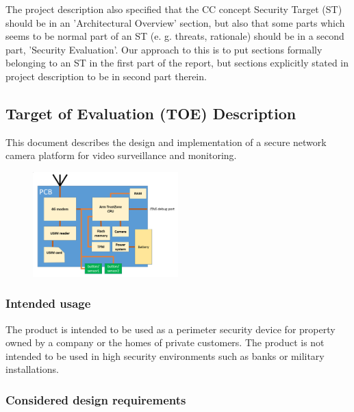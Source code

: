 \documentclass[10pt]{article}
\begin{document}
	{ \footnotesize The project description also specified that the CC concept Security Target (ST)
	should be in an 'Architectural Overview' section, but also that some parts 
	which seems to be normal part of an ST (e. g. threats, rationale) \cite{stwiki} should be in a
	second part, 'Security Evaluation'. Our approach to this is to put sections formally 
	belonging to an ST in the first part of the report, but sections explicitly stated in project description 
	to be in second part therein. }

    \subsection{Target of Evaluation (TOE) Description}

      This document describes the design and implementation of a secure network
      camera platform for video surveillance and monitoring.

      \begin{figure}[!h]
        \center
        \includegraphics[width=0.5\textwidth]{input/pcb_camera.png}
      \end{figure}

      \subsubsection{Intended usage}

        The product is intended to be used as a perimeter security device for
        property owned by a company or the homes of private customers. The
        product is not intended to be used in high security environments such
        as banks or military installations.

      \subsubsection{Considered design requirements}

\end{document}
